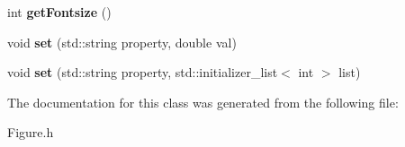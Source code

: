 \begin{DoxyCompactItemize}
\item 
\hypertarget{classkeycpp_1_1_figure_a6c1e59c4e8288e3880bde70db3723037}{int {\bfseries get\-Fontsize} ()}\label{classkeycpp_1_1_figure_a6c1e59c4e8288e3880bde70db3723037}

\item 
\hypertarget{classkeycpp_1_1_figure_a7375fe8611759fda180d626f91eab510}{void {\bfseries set} (std\-::string property, double val)}\label{classkeycpp_1_1_figure_a7375fe8611759fda180d626f91eab510}

\item 
\hypertarget{classkeycpp_1_1_figure_af82ed243d2b4f59f5e01566eb03cf9d3}{void {\bfseries set} (std\-::string property, std\-::initializer\-\_\-list$<$ int $>$ list)}\label{classkeycpp_1_1_figure_af82ed243d2b4f59f5e01566eb03cf9d3}

\end{DoxyCompactItemize}


The documentation for this class was generated from the following file\-:\begin{DoxyCompactItemize}
\item 
Figure.\-h\end{DoxyCompactItemize}

